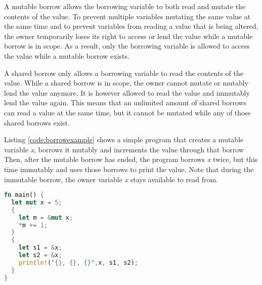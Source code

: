 A mutable borrow allows the borrowing variable to both read and mutate the contents of the value.
To prevent multiple variables mutating the same value at the same time and to prevent variables from reading a value that is being altered, the owner temporarily loses its right to access or lend the value while a mutable borrow is in scope.
As a result, only the borrowing variable is allowed to access the value while a mutable borrow exists.

A shared borrow only allows a borrowing variable to read the contents of the value.
While a shared borrow is in scope, the owner cannot mutate or mutably lend the value anymore.
It is however allowed to read the value and immutably lend the value again.
This means that an unlimited amount of shared borrows can read a value at the same time, but it cannot be mutated while any of those shared borrows exist.

Listing \ref{code:borrowexample} shows a simple program that creates a mutable variable \textit{x}, borrows it mutably and increments the value through that borrow 
Then, after the mutable borrow has ended, the program borrows \textit{x} twice, but this time immutably and uses those borrows to print the value. Note that during the immutable borrow, the owner variable \textit{x} stays available to read from.

\begin{lstlisting}[language=Rust,frame=single,caption=Borrowing an integer,label=code:borrowexample]
fn main() {
  let mut x = 5;
  {
    let m = &mut x;
    *m += 1;
  }
  {
    let s1 = &x;
    let s2 = &x;
    println!("{}, {}, {}",x, s1, s2);
  }
}
\end{lstlisting}


